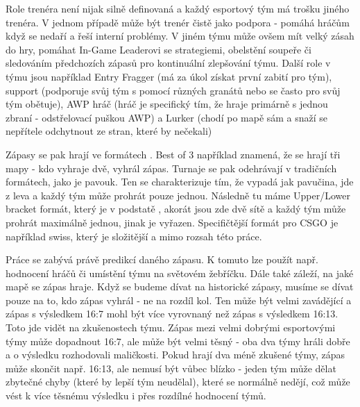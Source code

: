 Role trenéra není nijak silně definovaná a každý esportový tým má trošku jiného trenéra. V jednom případě může být trenér čistě jako podpora - pomáhá hráčům když se nedaří a
řeší interní problémy. V jiném týmu může ovšem mít velký zásah do hry, pomáhat In-Game Leaderovi se strategiemi, obelstění soupeře či sledováním předchozích zápasů pro
kontinuální zlepšování týmu. Další role v týmu jsou například Entry Fragger (má za úkol získat první zabití pro tým), support (podporuje svůj tým s pomocí různých granátů
nebo se často pro svůj tým obětuje), AWP hráč (hráč je specifický tím, že hraje primárně s jednou zbraní - odstřelovací puškou AWP) a Lurker (chodí po mapě sám a snaží se
nepřítele odchytnout ze stran, které by nečekali)

Zápasy se pak hrají ve formátech . Best of 3 například znamená, že se hrají tři mapy - kdo vyhraje dvě, vyhrál zápas. Turnaje se pak odehrávají v tradičních
formátech, jako je pavouk. Ten se charakterizuje tím, že vypadá jak pavučina, jde z leva a každý tým může prohrát pouze jednou. Následně tu máme Upper/Lower bracket formát,
který je v podstatě , akorát jsou zde dvě sítě a každý tým může prohrát maximálně jednou, jinak je vyřazen. Specifičtější formát pro \ac{CSGO} je
například swiss, který je složitější a mimo rozsah této práce.

Práce se zabývá právě predikcí daného zápasu. K tomuto lze použít např. hodnocení hráčů či umístění týmu na světovém žebříčku. Dále také záleží, na jaké mapě se zápas hraje.
Když se budeme dívat na historické zápasy, musíme se dívat pouze na to, kdo zápas vyhrál - ne na rozdíl kol. Ten může být velmi zavádějící a zápas s výsledkem 16:7 mohl být
více vyrovnaný než zápas s výsledkem 16:13. Toto jde vidět na zkušenostech týmu. Zápas mezi velmi dobrými esportovými týmy může dopadnout 16:7, ale může být velmi těsný - oba
dva týmy hráli dobře a o výsledku rozhodovali maličkosti. Pokud hrají dva méně zkušené týmy, zápas může skončit např. 16:13, ale nemusí být vůbec blízko - jeden tým může dělat
zbytečné chyby (které by lepší tým neudělal), které se normálně nedějí, což může vést k více těsnému výsledku i přes rozdílné hodnocení týmů.  